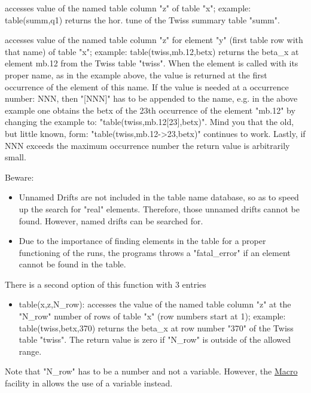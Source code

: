 \begin{madlist}
   accesses value of the named table column "z"
  of table "x"; example: table(summ,q1) returns the hor. tune of
  the Twiss summary table "summ".  

   accesses value of the named table column "z"
  for element "y" (first table row with that name) of table "x";
  example: table(twiss,mb.12,betx) returns the beta\_x at
  element mb.12 from the Twiss table "twiss".   When the element
  is called with its proper name, as in the example above, the
  value is returned at the first occurrence of the element of
  this name. If the value is needed at a occurrence number: NNN,
  then "[NNN]" has to be appended to the name, e.g. in the above
  example one obtains the betx of the 23th occurrence of the
  element "mb.12" by changing the example to:
  "table(twiss,mb.12[23],betx)". Mind you that the old, but
  little known, form: "table(twiss,mb.12-\textgreater 23,betx)"
  continues to work. Lastly, if NNN exceeds the maximum
  occurrence number the return value is arbitrarily small.  
\end{madlist}

Beware: 
\begin{itemize}
   \item  Unnamed Drifts are not included in the table name
          database, so as to speed up the search for "real"
          elements. Therefore, those  unnamed drifts cannot be
          found. However, named drifts can be searched for.  
   \item  Due to the importance of finding elements in the table
          for a proper functioning of the \madx runs, the programs
          throws a "fatal\_error" if an element cannot be found in the
          table.   
\end{itemize}

There is a second option of this function with 3 entries  
\begin{itemize}
    \item table(x,z,N\_row): accesses the value of the named table
          column  "z" at the "N\_row" number of rows of table "x" (row
          numbers start at  1); example: table(twiss,betx,370) returns
          the beta\_x at row number  "370" of the Twiss table
          "twiss". The return value is zero if "N\_row"  is outside of
          the allowed range.
\end{itemize}

Note that "N\_row" has to be a number and not a  variable. However, the
\hyperref[sec:macro]{Macro} facility in \madx allows
the use of a variable instead.   

